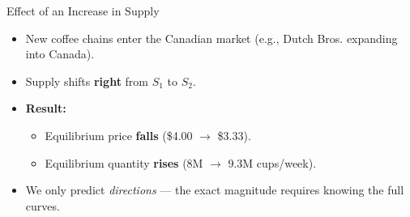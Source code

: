 \documentclass[aspectratio=169]{beamer}
\begin{document}
\begin{frame}{Effect of an Increase in Supply}
\transfade
\begin{itemize}
  \item New coffee chains enter the Canadian market (e.g., Dutch Bros. expanding into Canada).
  \item Supply shifts \textbf{right} from $S_1$ to $S_2$.
  \item \textbf{Result:}
  \begin{itemize}
    \item Equilibrium price \textbf{falls} (\$4.00 $\to$ \$3.33).
    \item Equilibrium quantity \textbf{rises} (8M $\to$ 9.3M cups/week).
  \end{itemize}
  \item We only predict \emph{directions} --- the exact magnitude requires knowing the full curves.
\end{itemize}
\end{frame}
\end{document}
